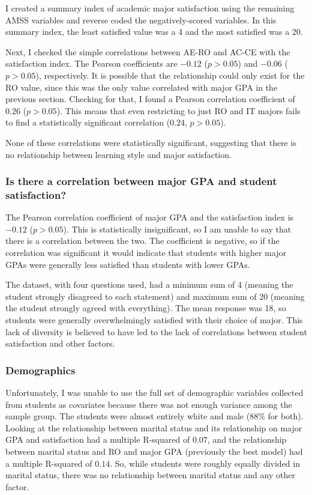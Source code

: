 I created a summary index of academic major satisfaction using the remaining AMSS variables and reverse coded the negatively-scored variables. In this summary index, the least satisfied value was a 4 and the most satisfied was a 20.

Next, I checked the simple correlations between AE-RO and AC-CE with the satisfaction index. The Pearson coefficients are $-0.12$ ($p>0.05$) and $-0.06$ ($p>0.05$), respectively. It is possible that the relationship could only exist for the RO value, since this was the only value correlated with major GPA in the previous section. Checking for that, I found a Pearson correlation coefficient of $0.26$ ($p>0.05$). This means that even restricting to just RO and IT majors fails to find a statistically significant correlation ($0.24$, $p>0.05$).

None of these correlations were statistically significant, suggesting that there is no relationship between learning style and major satisfaction.

\subsubsection{Is there a correlation between major GPA and student satisfaction?}
The Pearson correlation coefficient of major GPA and the satisfaction index is $-0.12$ ($p>0.05$). This is statistically insignificant, so I am unable to say that there is a correlation between the two. The coefficient is negative, so if the correlation was significant it would indicate that students with higher major GPAs were generally less satisfied than students with lower GPAs.

The dataset, with four questions used, had a minimum sum of 4 (meaning the student strongly disagreed to each statement) and maximum sum of 20 (meaning the student strongly agreed with everything). The mean response was 18, so students were generally overwhelmingly satisfied with their choice of major. This lack of diversity is believed to have led to the lack of correlations between student satisfaction and other factors.

\subsubsection{Demographics}
Unfortunately, I was unable to use the full set of demographic variables collected from students as covariates because there was not enough variance among the sample group. The students were almost entirely white and male (88\% for both). Looking at the relationship between marital status and its relationship on major GPA and satisfaction had a multiple R-squared of $0.07$, and the relationship between marital status and RO and major GPA (previously the best model) had a multiple R-squared of $0.14$. So, while students were roughly equally divided in marital status, there was no relationship between marital status and any other factor.

